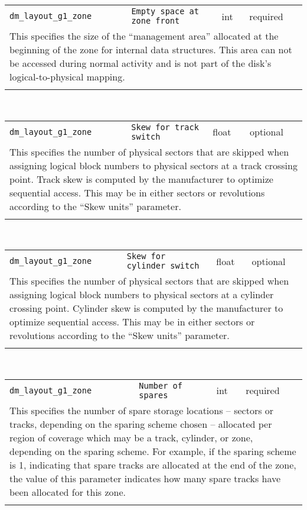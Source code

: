 \noindent 
\begin{tabular}{|p{1.5in}|p{3.5in}|p{0.5in}|p{0.5in}|}
\cline{1-4}
\texttt{dm\_layout\_g1\_zone} & \texttt{Empty space at zone front} & int & required \\ 
\cline{1-4}
\multicolumn{4}{|p{6in}|}{
This specifies the size of the ``management area'' allocated at the
beginning of the zone for internal data structures. This area can not
be accessed during normal activity and is not part of the disk's
logical-to-physical mapping.
}\\ 
\cline{1-4}
\multicolumn{4}{p{5in}}{}\\
\end{tabular}\\ 
\noindent 
\begin{tabular}{|p{1.5in}|p{3.5in}|p{0.5in}|p{0.5in}|}
\cline{1-4}
\texttt{dm\_layout\_g1\_zone} & \texttt{Skew for track switch} & float & optional \\ 
\cline{1-4}
\multicolumn{4}{|p{6in}|}{
This specifies the number of physical sectors that are skipped when
assigning logical block numbers to physical sectors at a track
crossing point. Track skew is computed by the manufacturer to
optimize sequential access. This may be in either sectors or
revolutions according to the ``Skew units'' parameter.
}\\ 
\cline{1-4}
\multicolumn{4}{p{5in}}{}\\
\end{tabular}\\ 
\noindent 
\begin{tabular}{|p{1.5in}|p{3.5in}|p{0.5in}|p{0.5in}|}
\cline{1-4}
\texttt{dm\_layout\_g1\_zone} & \texttt{Skew for cylinder switch} & float & optional \\ 
\cline{1-4}
\multicolumn{4}{|p{6in}|}{
This specifies the number of physical sectors that are skipped when
assigning logical block numbers to physical sectors at a cylinder
crossing point. Cylinder skew is computed by the manufacturer to
optimize sequential access. This may be in either sectors or
revolutions according to the ``Skew units'' parameter.
}\\ 
\cline{1-4}
\multicolumn{4}{p{5in}}{}\\
\end{tabular}\\ 
\noindent 
\begin{tabular}{|p{1.5in}|p{3.5in}|p{0.5in}|p{0.5in}|}
\cline{1-4}
\texttt{dm\_layout\_g1\_zone} & \texttt{Number of spares} & int & required \\ 
\cline{1-4}
\multicolumn{4}{|p{6in}|}{
This specifies the number of spare storage locations -- sectors or tracks,
depending on the sparing scheme chosen -- allocated per region of
coverage which may be a track, cylinder, or zone, depending on the
sparing scheme. For example, if the sparing scheme is 1, indicating
that spare tracks are allocated at the end of the zone, the value of
this parameter indicates how many spare tracks have been allocated for
this zone.
}\\ 
\cline{1-4}
\multicolumn{4}{p{5in}}{}\\
\end{tabular}\\ 

